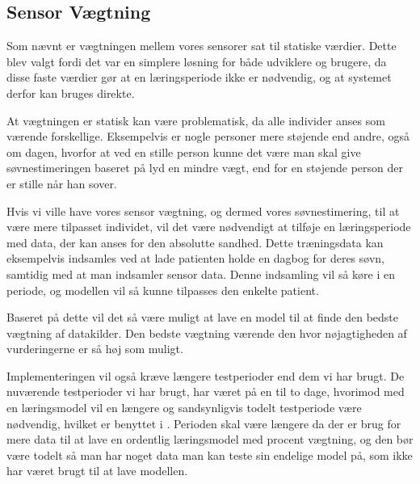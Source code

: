 \subsection{Sensor Vægtning}\label{subsec:sensorvaegtsoevn}
Som nævnt er vægtningen mellem vores sensorer sat til statiske værdier.
Dette blev valgt fordi det var en simplere løsning for både udviklere og brugere, da disse faste værdier gør at en læringsperiode ikke er nødvendig, og at systemet derfor kan bruges direkte.

At vægtningen er statisk kan være problematisk, da alle individer anses som værende forskellige. 
Eksempelvis er nogle personer mere støjende end andre, også om dagen, hvorfor at ved en stille person kunne det være man skal give søvnestimeringen baseret på lyd en mindre vægt, end for en støjende person der er stille når han sover.

Hvis vi ville have vores sensor vægtning, og dermed vores søvnestimering, til at være mere tilpasset individet, vil det være nødvendigt at tilføje en læringsperiode med data, der kan anses for den absolutte sandhed.
Dette træningsdata kan eksempelvis indsamles ved at lade patienten holde en dagbog for deres søvn, samtidig med at man indsamler sensor data.
Denne indsamling vil så køre i en periode, og modellen vil så kunne tilpasses den enkelte patient.

Baseret på dette vil det så være muligt at lave en model til at finde den bedste vægtning af datakilder.
Den bedste vægtning værende den hvor nøjagtigheden af vurderingerne er så høj som muligt.

Implementeringen vil også kræve længere testperioder end dem vi har brugt.
De nuværende testperioder vi har brugt, har været på en til to dage, hvorimod med en læringsmodel vil en længere og sandsynligvis todelt testperiode være nødvendig, hvilket er benyttet i \citet{6563918}.
Perioden skal være længere da der er brug for mere data til at lave en ordentlig læringsmodel med procent vægtning, og den bør være todelt så man har noget data man kan teste sin endelige model på, som ikke har været brugt til at lave modellen.
